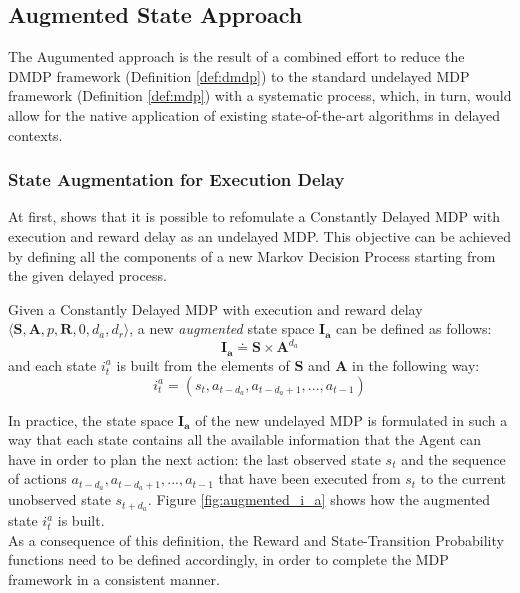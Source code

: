         \subsection{Augmented State Approach}
            \label{subs:augmentedapproach}
            The Augumented approach is the result of a combined effort to reduce the DMDP framework (Definition \ref{def:dmdp}) to the standard undelayed MDP framework (Definition \ref{def:mdp}) with a systematic process, which, in turn, would allow for the native application of existing state-of-the-art algorithms in delayed contexts.
            
            \subsubsection{State Augmentation for Execution Delay}
                At first,  shows that it is possible to refomulate a Constantly Delayed MDP with execution and reward delay as an undelayed MDP. This objective can be achieved by defining all the components of a new Markov Decision Process starting from the given delayed process.
                
                \begin{definition}
                    \label{def:execaugmentstate}
                    Given a Constantly Delayed MDP with execution and reward delay $\langle \mathbf{S}, \mathbf{A}, p, \mathbf{R}, 0, d_a, d_r \rangle$,
                    a new \textit{augmented} state space $\mathbf{I_{a}}$ can be defined as follows:
                    \[ \mathbf{I_{a}} \doteq \mathbf{S} \times \mathbf{A}^{d_a} \]
                    and each state $i^a_t$ is built from the elements of $\mathbf{S}$ and $\mathbf{A}$ in the following way:
                    \[ i_t^a = \left( s_t, a_{t-d_{a}}, a_{t-d_{a}+1}, ..., a_{t-1} \right)\]
                \end{definition}
                
                In practice, the state space $\mathbf{I_{a}}$ of the new undelayed MDP is formulated in such a way that each state contains all the available information that the Agent can have in order to plan the next action: the last observed state $s_t$ and the sequence of actions ${a_{t-d_{a}}, a_{t-d_{a}+1}, ..., a_{t-1}}$ that have been executed from $s_t$ to the current unobserved state $s_{t+d_{a}}$. Figure \ref{fig:augmented_i_a} shows how the augmented state $i_t^a$ is built. 
                \\
                As a consequence of this definition, the Reward and State-Transition Probability functions need to be defined accordingly, in order to complete the MDP framework in a consistent manner.
                
